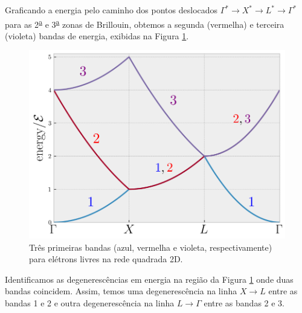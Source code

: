 \documentclass[a4paper,10pt]{article}
\begin{document}
\n\n

Graficando a energia pelo caminho dos pontos deslocados $\Gamma^* \to X^* \to L^* \to \Gamma^*$ para as 2\textsuperscript{\underline{a}} e 3\textsuperscript{\underline{a}} zonas de Brillouin, obtemos a segunda (vermelha) e terceira (violeta) bandas de energia, exibidas na Figura \ref{fig:band_struct_square_free-123}.
\begin{figure}[H]
\centering
\includegraphics[width=0.7\linewidth]{fig/band_struct_square_free-123-labels.png}
\caption{Três primeiras bandas (azul, vermelha e violeta, respectivamente) para elétrons livres na rede quadrada 2D.}
\label{fig:band_struct_square_free-123}
\end{figure}

\n

Identificamos as degenerescências em energia na região da Figura \ref{fig:band_struct_square_free-123} onde duas bandas coincidem. Assim, temos uma degenerescência na linha $X \to L$ entre as bandas 1 e 2 e outra degenerescência na linha $L \to \Gamma$ entre as bandas 2 e 3.

\pagebreak

\section{}
\end{document}
